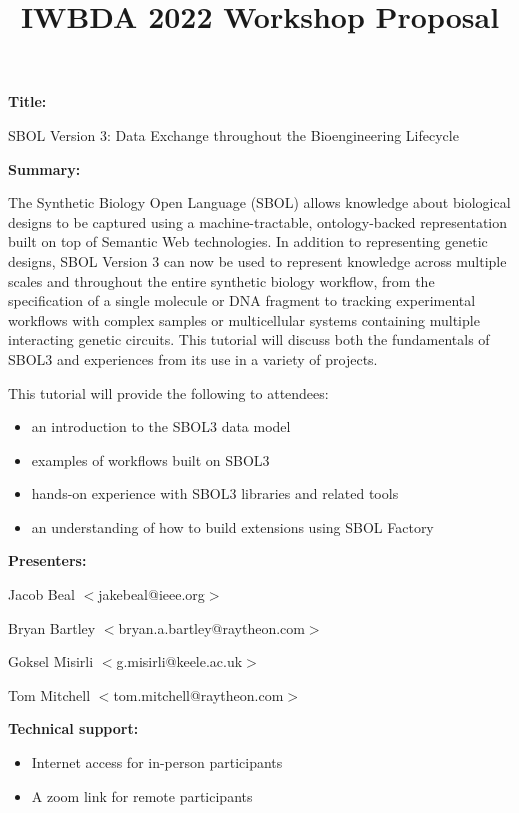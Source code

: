 \documentclass{article}
\title{IWBDA 2022 Workshop Proposal}
\author{}
\begin{document}
\maketitle

\textbf{Title:}

SBOL Version 3: Data Exchange throughout the Bioengineering Lifecycle

\vspace{\baselineskip}

\textbf{Summary:}

The Synthetic Biology Open Language (SBOL) allows knowledge about biological designs to be captured using a machine-tractable, ontology-backed representation built on top of Semantic Web technologies. In addition to representing genetic designs, SBOL Version 3 can
now be used to represent knowledge across multiple scales and throughout the entire synthetic biology workflow, from the specification of a single molecule or DNA fragment to tracking experimental workflows with complex samples or multicellular systems containing multiple interacting genetic circuits. This tutorial will discuss both the fundamentals of SBOL3 and experiences from its use in a variety of projects.

\vspace{\baselineskip}
This tutorial will provide the following to attendees:

\begin{itemize}
    \item an introduction to the SBOL3 data model
    \item examples of workflows built on SBOL3
    \item hands-on experience with SBOL3 libraries and related tools
    \item an understanding of how to build extensions using SBOL Factory
\end{itemize}

\vspace{\baselineskip}

\textbf{Presenters:}

Jacob Beal $<$jakebeal@ieee.org$>$

Bryan Bartley $<$bryan.a.bartley@raytheon.com$>$

Goksel Misirli $<$g.misirli@keele.ac.uk$>$

Tom Mitchell $<$tom.mitchell@raytheon.com$>$

\vspace{\baselineskip}

\textbf{Technical support:}
\begin{itemize}
    \item Internet access for in-person participants
    \item A zoom link for remote participants
\end{itemize}
\end{document}
